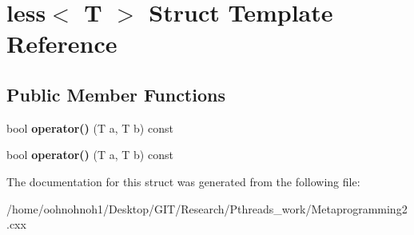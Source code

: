 \hypertarget{structless}{}\section{less$<$ T $>$ Struct Template Reference}
\label{structless}
\subsection*{Public Member Functions}
\begin{DoxyCompactItemize}
\item 
\mbox{\label{structless_a087ca6938bbfd0310df3dd3d3e2ff30e}} 
bool {\bfseries operator()} (T a, T b) const
\item 
\mbox{\label{structless_a087ca6938bbfd0310df3dd3d3e2ff30e}} 
bool {\bfseries operator()} (T a, T b) const
\end{DoxyCompactItemize}


The documentation for this struct was generated from the following file\+:\begin{DoxyCompactItemize}
\item 
/home/oohnohnoh1/\+Desktop/\+G\+I\+T/\+Research/\+Pthreads\+\_\+work/Metaprogramming2.\+cxx\end{DoxyCompactItemize}
